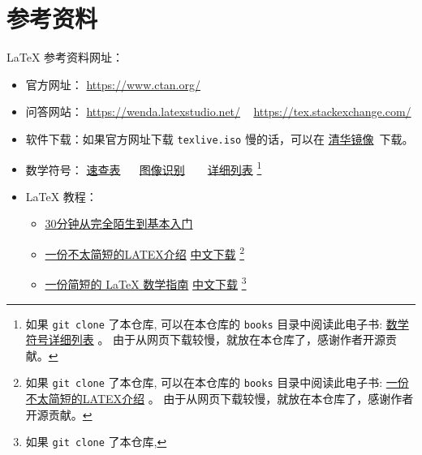 \documentclass[
    11pt,
    cite=authoryear,
    device=normal,
    lang=cn,
    mode=simple,
    result=answer,
    toc=onecol,
]{elegantbook_sierxue}
\begin{document}
\section{参考资料}%
\label{sec:latex-refs}

\LaTeX{} 参考资料网址：
\begin{itemize}
    \item 官方网址： \href{https://www.ctan.org/}{https://www.ctan.org/}
    \item 问答网站：
        \href{https://wenda.latexstudio.net/}{https://wenda.latexstudio.net/}
        ~
        \href{https://tex.stackexchange.com/}{https://tex.stackexchange.com/}
    \item 软件下载：如果官方网址下载 \lstinline{texlive.iso} 慢的话，可以在
    \href{https://mirrors.tuna.tsinghua.edu.cn/CTAN/systems/texlive/Images/}
                {清华镜像}~下载。
    \item 数学符号： \href{books/latex-math-symbols.pdf}{速查表}~ ~
        \href{http://detexify.kirelabs.org/classify.html} {图像识别} ~ ~
        \href{http://mirrors .ustc.edu.cn/CTAN/info/symbols/comprehensive/symbols-a4.pdf}
        {详细列表}
        \footnote{如果 \lstinline{git clone} 了本仓库,
        可以在本仓库的 \lstinline{books}
        目录中阅读此电子书:
        \href{books/symbols-a4.pdf}{数学符号详细列表} 。
        由于从网页下载较慢，就放在本仓库了，感谢作者开源贡献。}
    \item \LaTeX{} 教程：
        \begin{itemize}
            \item \href{https://www.latexstudio.net/archives/9377.html}
                {30分钟从完全陌生到基本入门}
            \item
                \href{https://www.ctan.org/tex-archive/info/lshort/chinese}
                {一份不太简短的LATEX介绍}
        \href{http://mirrors.ctan.org/info/lshort/chinese/lshort-zh-cn.pdf}
                {中文下载}
                \footnote{如果 \lstinline{git clone} 了本仓库,
                可以在本仓库的 \lstinline{books}
                目录中阅读此电子书:
                \href{books/lshort-zh-cn.pdf}{一份不太简短的LATEX介绍} 。
                由于从网页下载较慢，就放在本仓库了，感谢作者开源贡献。}
            \item
                \href{https://www.ctan.org/tex-archive/info/lshort/chinese}
                {一份简短的 LaTeX 数学指南}
                \href{https://wenda.latexstudio.net/article-5006.html}
                {中文下载}
                \footnote{如果 \lstinline{git clone} 了本仓库,
}
\end{itemize}
\end{itemize}
\end{document}
